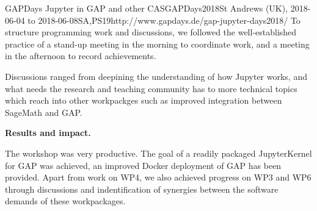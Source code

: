 \begin{event}{GAPDays Jupyter in GAP and other CAS}{GAPDays2018}{St Andrews (UK),
2018-06-04 to 2018-06-08}{SA,PS}{19}{http://www.gapdays.de/gap-jupyter-days2018/}
To structure programming work and discussions, we followed the well-established
practice of a stand-up meeting in the morning to coordinate work, and a meeting
in the afternoon to record achievements.

Discussions ranged from deepining the understanding of how Jupyter works, and
what needs the research and teaching community has to more technical topics
which reach into other workpackges such as improved integration between SageMath
and GAP.

\textbf{Results and impact.} 

The workshop was very productive. The goal of a readily packaged JupyterKernel
for GAP was achieved, an improved Docker deployment of GAP has been provided.
Apart from work on WP4, we also achieved progress on WP3 and WP6 through
discussions and indentification of synergies between the software demands of
these workpackages.


\end{event}
